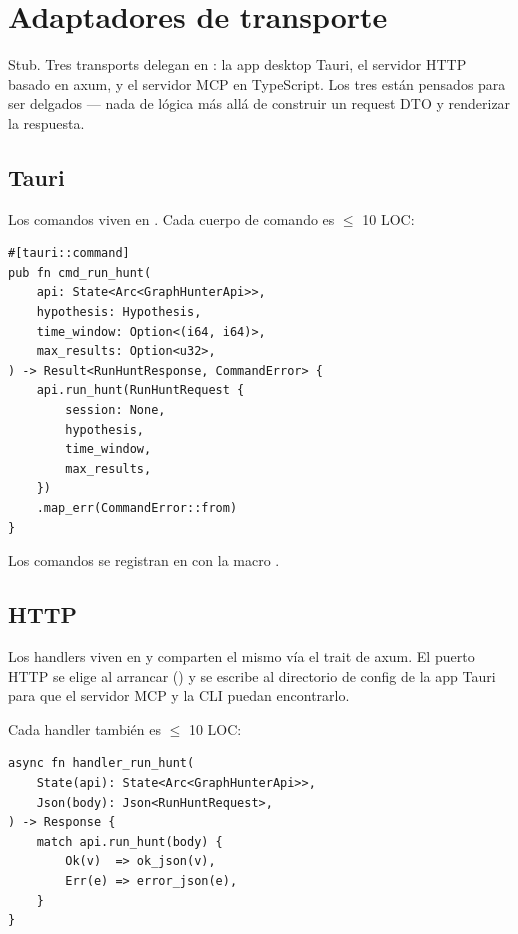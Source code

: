 \chapter{Adaptadores de transporte}
\label{ch:transports}

\begin{note}
Stub. Tres transports delegan en : la app
desktop Tauri, el servidor HTTP basado en axum, y el servidor
MCP en TypeScript. Los tres están pensados para ser delgados
--- nada de lógica más allá de construir un request DTO y
renderizar la respuesta.
\end{note}

\section{Tauri}

Los comandos viven en
. Cada cuerpo de
comando es $\leq$ 10 LOC:

\begin{lstlisting}[style=rust]
#[tauri::command]
pub fn cmd_run_hunt(
    api: State<Arc<GraphHunterApi>>,
    hypothesis: Hypothesis,
    time_window: Option<(i64, i64)>,
    max_results: Option<u32>,
) -> Result<RunHuntResponse, CommandError> {
    api.run_hunt(RunHuntRequest {
        session: None,
        hypothesis,
        time_window,
        max_results,
    })
    .map_err(CommandError::from)
}
\end{lstlisting}

Los comandos se registran en 
con la macro .

\section{HTTP}

Los handlers viven en
 y comparten el mismo
 vía el trait  de axum.
El puerto HTTP se elige al arrancar
() y se escribe al directorio de
config de la app Tauri para que el servidor MCP y la CLI puedan
encontrarlo.

Cada handler también es $\leq$ 10 LOC:

\begin{lstlisting}[style=rust]
async fn handler_run_hunt(
    State(api): State<Arc<GraphHunterApi>>,
    Json(body): Json<RunHuntRequest>,
) -> Response {
    match api.run_hunt(body) {
        Ok(v)  => ok_json(v),
        Err(e) => error_json(e),
    }
}
\end{lstlisting}

